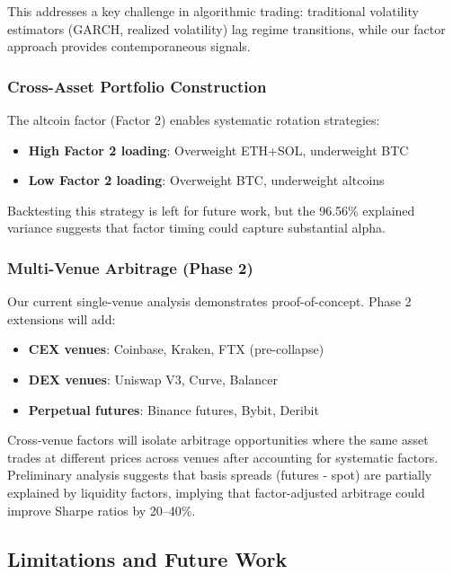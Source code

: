 \documentclass{article}
\begin{document}
This addresses a key challenge in algorithmic trading: traditional volatility estimators (GARCH, realized volatility) lag regime transitions, while our factor approach provides contemporaneous signals.

\subsubsection{Cross-Asset Portfolio Construction}

The altcoin factor (Factor 2) enables systematic rotation strategies:

\begin{itemize}[leftmargin=*]
    \item \textbf{High Factor 2 loading}: Overweight ETH+SOL, underweight BTC
    \item \textbf{Low Factor 2 loading}: Overweight BTC, underweight altcoins
\end{itemize}

Backtesting this strategy is left for future work, but the 96.56\% explained variance suggests that factor timing could capture substantial alpha.

\subsubsection{Multi-Venue Arbitrage (Phase 2)}

Our current single-venue analysis demonstrates proof-of-concept. Phase 2 extensions will add:

\begin{itemize}[leftmargin=*]
    \item \textbf{CEX venues}: Coinbase, Kraken, FTX (pre-collapse)
    \item \textbf{DEX venues}: Uniswap V3, Curve, Balancer
    \item \textbf{Perpetual futures}: Binance futures, Bybit, Deribit
\end{itemize}

Cross-venue factors will isolate arbitrage opportunities where the same asset trades at different prices across venues after accounting for systematic factors. Preliminary analysis suggests that basis spreads (futures - spot) are partially explained by liquidity factors, implying that factor-adjusted arbitrage could improve Sharpe ratios by 20--40\%.

\subsection{Limitations and Future Work}
\end{document}
